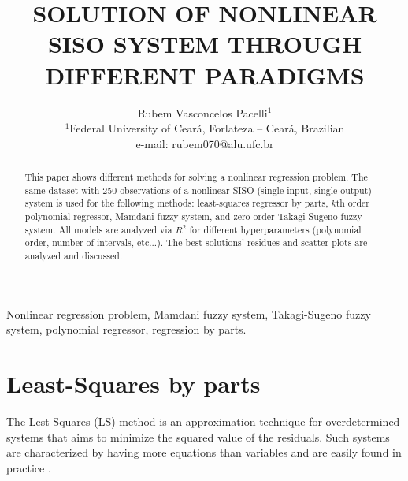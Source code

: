 \documentclass[english]{sobraep}
\title{SOLUTION OF NONLINEAR SISO SYSTEM THROUGH DIFFERENT PARADIGMS}
\author{Rubem Vasconcelos Pacelli$^{1}$\\
	\normalsize $^{1}$Federal University of Ceará, Forlateza -- Ceará, Brazilian\\
	\normalsize e-mail: rubem070@alu.ufc.br
}
\begin{document}
\maketitle

\begin{abstract}
	This paper shows different methods for solving a nonlinear regression problem. The same dataset with 250 observations of a nonlinear SISO (single input, single output) system is used for the following methods: least-squares regressor by parts, $k$th order polynomial regressor, Mamdani fuzzy system, and zero-order Takagi-Sugeno fuzzy system. All models are analyzed via $R^2$ for different hyperparameters (polynomial order, number of intervals, etc...). The best solutions' residues and scatter plots are analyzed and discussed.
\end{abstract}

\begin{keywords}
	Nonlinear regression problem, Mamdani fuzzy system, Takagi-Sugeno fuzzy system, polynomial regressor, regression by parts. 
\end{keywords}






\section{Least-Squares by parts}

The Lest-Squares (LS) method is an approximation technique for overdetermined systems that aims to minimize the squared value of the residuals. Such systems are characterized by having more equations than variables and are easily found in practice \cite{kay1993fundamentals}.
\end{document}
